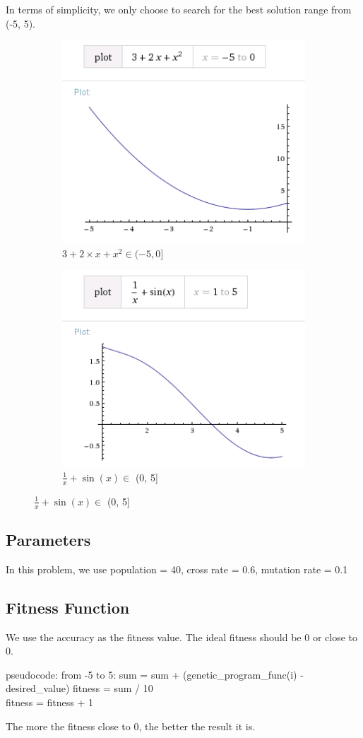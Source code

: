 \documentclass[11pt, a4paper, oneside, openright]{article}
\begin{document}
In terms of simplicity, we only choose to search for the best solution range from (-5, 5).
  \begin{figure}[!ht]
	\centering
	\begin{subfigure}[b]{0.4\textwidth}
		\includegraphics[scale=0.5]{pics/negative.png}
  		\caption{ $3 + 2  \times x + x^2 \in (-5,0]$ }
 		 \label{fig:negative}
	\end{subfigure}
	\begin{subfigure}[b]{0.4\textwidth}
  		\includegraphics[scale=0.5]{pics/positive.png}
 		 \caption{ $\frac{1}{x} + \sin(x) \in $ (0, 5] }
 	 	\label{fig:positve}
	\end{subfigure}
  \end{figure}

\subsection{Parameters}
In this problem, we use population = 40, cross rate = 0.6, mutation rate = 0.1
\subsection{Fitness Function}
We use the accuracy as the fitness value. The ideal fitness should be 0 or close to 0.
\begin{program}
\mbox{pseudocode:}
\hspace *{4cm} \FOR \hspace*{2mm} from \hspace*{2mm}-5\hspace*{2mm} to\hspace*{2mm} 5:
		sum = sum + (genetic\_program\_func(i)  - desired\_value)
		fitness = sum / 10
 \\%
	fitness =  fitness + 1
\end{program}
The more the fitness close to 0, the better the result it is.
\end{document}
